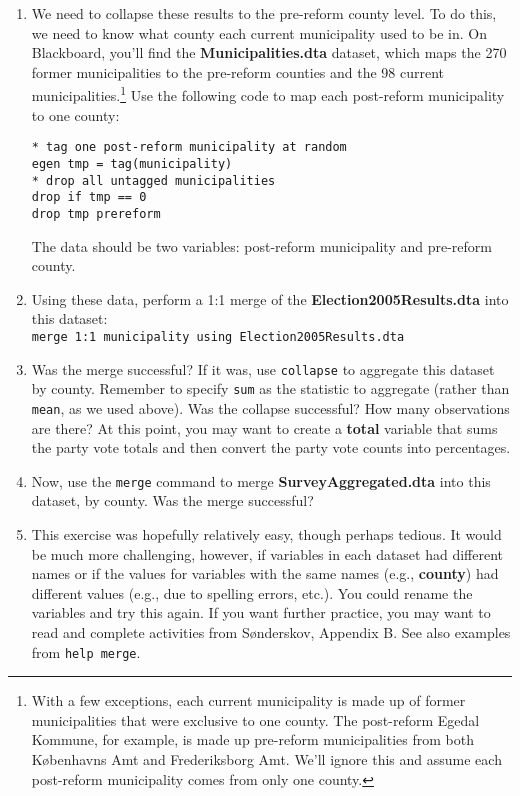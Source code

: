 \documentclass[a4paper,12pt]{article}
\begin{document}
\begin{enumerate}
\item We need to collapse these results to the pre-reform county level. To do this, we need to know what county each current municipality used to be in. On Blackboard, you'll find the \textbf{Municipalities.dta} dataset, which maps the 270 former municipalities to the pre-reform counties and the 98 current municipalities.\footnote{With a few exceptions, each current municipality is made up of former municipalities that were exclusive to one county. The post-reform Egedal Kommune, for example, is made up pre-reform municipalities from both K{\o}benhavns Amt and Frederiksborg Amt. We'll ignore this and assume each post-reform municipality comes from only one county. } Use the following code to map each post-reform municipality to one county:

\begin{verbatim}
* tag one post-reform municipality at random
egen tmp = tag(municipality)
* drop all untagged municipalities
drop if tmp == 0
drop tmp prereform
\end{verbatim}

The data should be two variables: post-reform municipality and pre-reform county.

\item Using these data, perform a 1:1 merge of the \textbf{Election2005Results.dta} into this dataset:\\
\texttt{merge 1:1 municipality using Election2005Results.dta}

\item Was the merge successful? If it was, use \texttt{collapse} to aggregate this dataset by county. Remember to specify \texttt{sum} as the statistic to aggregate (rather than \texttt{mean}, as we used above). Was the collapse successful? How many observations are there? At this point, you may want to create a \textbf{total} variable that sums the party vote totals and then convert the party vote counts into percentages.


\item Now, use the \texttt{merge} command to merge \textbf{SurveyAggregated.dta} into this dataset, by county. Was the merge successful?

\item This exercise was hopefully relatively easy, though perhaps tedious. It would be much more challenging, however, if variables in each dataset had different names or if the values for variables with the same names (e.g., \textbf{county}) had different values (e.g., due to spelling errors, etc.). You could rename the variables and try this again. If you want further practice, you may want to read and complete activities from S{\o}nderskov, Appendix B. See also examples from \texttt{help merge}.


\end{enumerate}
\end{document}

